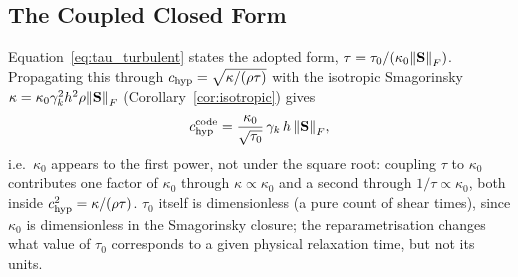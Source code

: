 \documentclass[11pt, a4paper, parskip]{scrartcl}
\theoremstyle{plain}
\theoremstyle{definition}
\theoremstyle{remark}
\newcommand{\Shear}{\mathbf{S}}                           %
\newcommand{\kappaC}{\kappa_{0}}                          %
\newcommand{\kappaP}{\kappa}                              %
\newcommand{\gammak}{\gamma_{k}}                          %
\newcommand{\chyp}{c_{\rm hyp}}                           %
\newcommand{\taurelax}{\tau}                              %
\begin{document}
\subsection{The Coupled Closed Form}
Equation~\eqref{eq:tau_turbulent} states the adopted form,
$\taurelax=\taurelax_0/(\kappaC\norm{\Shear}_F)$. Propagating this through
$\chyp=\sqrt{\kappaP/(\rho\taurelax)}$ with the isotropic Smagorinsky
$\kappaP=\kappaC\gammak^2h^2\rho\norm{\Shear}_F$
(Corollary~\ref{cor:isotropic}) gives
\begin{equation}
  \label{eq:code_turbulent_new}
  \chyp^{\rm code} = \frac{\kappaC}{\sqrt{\taurelax_0}}\,\gammak\,h\,\norm{\Shear}_F ,
\end{equation}
i.e.\ $\kappaC$ appears to the first power, not under the square root:
coupling $\taurelax$ to $\kappaC$ contributes one factor of $\kappaC$
through $\kappaP\propto\kappaC$ and a second through
$1/\taurelax\propto\kappaC$, both inside $\chyp^2=\kappaP/(\rho\taurelax)$.
$\taurelax_0$ itself is dimensionless (a pure count of shear times),
since $\kappaC$ is dimensionless in the Smagorinsky closure; the
reparametrisation changes what value of $\taurelax_0$ corresponds to a
given physical relaxation time, but not its units.
\end{document}
